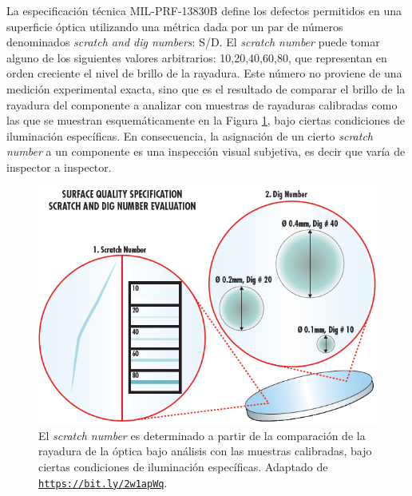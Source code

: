\hspace{0.5cm}La especificación técnica MIL-PRF-13830B define los defectos permitidos en una superficie óptica utilizando una métrica dada por un par de números denominados \textit{scratch and dig numbers}: S/D. El \textit{scratch number} puede tomar alguno de los siguientes valores arbitrarios: 10,20,40,60,80, que representan en orden creciente el nivel de brillo de la rayadura. Este número no proviene de una medición experimental exacta, sino que es el resultado de comparar el brillo de la rayadura del componente a analizar con muestras de rayaduras calibradas como las que se muestran esquemáticamente en la Figura \ref{fig:scratchanddig}, bajo ciertas condiciones de iluminación específicas. En consecuencia, la asignación de un cierto \textit{scratch number} a un componente es una inspección visual subjetiva, es decir que varía de inspector a inspector.


\begin{figure}[H]
	\centering
	\includegraphics[scale=1.0]{Figs/cuantificaciondefectos/scratchanddig.png}
	\caption{El \textit{scratch number} es determinado a partir de la comparación de la rayadura de la óptica bajo análisis con las muestras calibradas, bajo ciertas condiciones de iluminación específicas. Adaptado de \href{https://bit.ly/2w1apWq}{\texttt{https://bit.ly/2w1apWq}}.}
	\label{fig:scratchanddig}
\end{figure}

